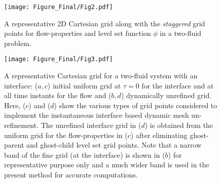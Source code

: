 \documentclass[preprint,12pt]{elsarticle}
\newcommand{\review}[1]{\color{black}#1}
\begin{document}
\begin{figure}
\begin{centering}
\texttt{[image: Figure\_Final/Fig2.pdf]}
\par\end{centering}

\protect\caption{\label{fig:Computational-stencil-with} A representative 2D Cartesian
grid along with the \textit{staggered} grid points for flow-properties
and level set function $\phi$ in a two-fluid problem.}
\end{figure}


\begin{figure}
\begin{centering}

\par\end{centering}

\noindent \begin{centering}
\texttt{[image: Figure\_Final/Fig3.pdf]}
\par\end{centering}

\protect\caption{\label{fig:(a)-Distribution-of}\review{A representative Cartesian grid for a two-fluid system with an interface: ($a,c$) initial uniform grid at $\tau=0$  for the interface and at all time instants for the flow and ($b,d$) dynamically unrefined grid. Here, ($c$) and ($d$) show the various types of grid points considered to implement the instantaneous interface based dynamic mesh un-refinement. The unrefined interface grid in ($d$) is obtained from the uniform grid for the flow-properties in ($c$) after eliminating ghost-parent and ghost-child level set grid points. Note that a narrow band of the fine grid (at the interface) is shown in ($b$) for representative purpose only and a much wider band is used in the present method for accurate computations.}}
\end{figure}
\end{document}

